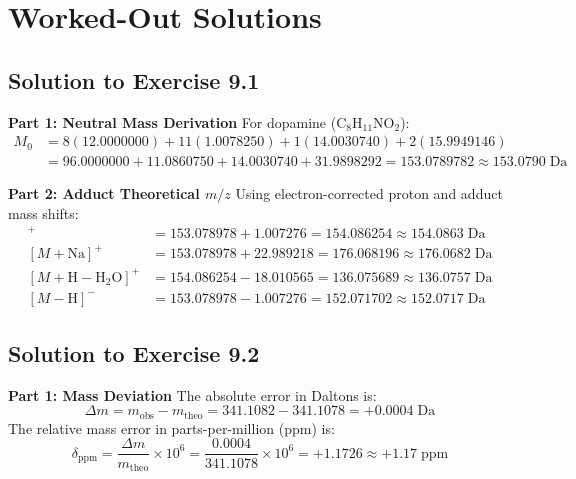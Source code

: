 \documentclass[11pt,twoside,openright]{book}
\begin{document}
\section{Worked-Out Solutions}

\subsection{Solution to Exercise 9.1}

\noindent\textbf{Part 1: Neutral Mass Derivation}\enspace
For dopamine ($\text{C}_8\text{H}_{11}\text{NO}_2$):
\begin{align}
M_0 &= 8(12.0000000) + 11(1.0078250) + 1(14.0030740) + 2(15.9949146) \nonumber \\
    &= 96.0000000 + 11.0860750 + 14.0030740 + 31.9898292 = 153.0789782 \approx 153.0790\;\text{Da}
\end{align}

\noindent\textbf{Part 2: Adduct Theoretical $m/z$}\enspace
Using electron-corrected proton and adduct mass shifts:
\begin{align}
[M+\text{H}]^+ &= 153.078978 + 1.007276 = 154.086254 \approx 154.0863\;\text{Da} \\
[M+\text{Na}]^+ &= 153.078978 + 22.989218 = 176.068196 \approx 176.0682\;\text{Da} \\
[M+\text{H}-\text{H}_2\text{O}]^+ &= 154.086254 - 18.010565 = 136.075689 \approx 136.0757\;\text{Da} \\
[M-\text{H}]^- &= 153.078978 - 1.007276 = 152.071702 \approx 152.0717\;\text{Da}
\end{align}

\subsection{Solution to Exercise 9.2}

\noindent\textbf{Part 1: Mass Deviation}\enspace
The absolute error in Daltons is:
\begin{equation}
\Delta m = m_{\text{obs}} - m_{\text{theo}} = 341.1082 - 341.1078 = +0.0004\;\text{Da}
\end{equation}
The relative mass error in parts-per-million (ppm) is:
\begin{equation}
\delta_{\text{ppm}} = \frac{\Delta m}{m_{\text{theo}}} \times 10^6 = \frac{0.0004}{341.1078} \times 10^6 = +1.1726 \approx +1.17\;\text{ppm}
\end{equation}
\end{document}
